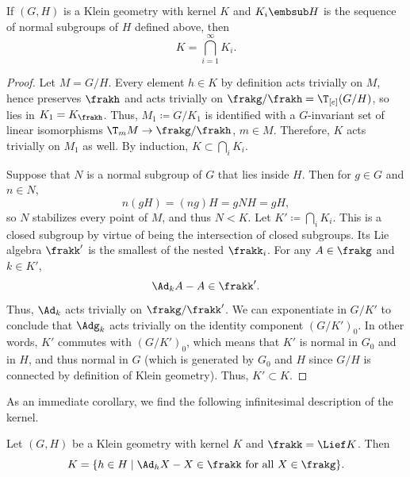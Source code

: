\begin{lem}
    If $(G,H)$ is a Klein geometry with kernel $K$ and $K_i\embsub H$ is the sequence of normal subgroups of $H$ defined above, then 
    \[K=\bigcap_{i=1}^\infty K_i.\]
\end{lem}
\begin{proof}
    Let $M=G\slash H$. Every element $h\in K$ by definition acts trivially on $M$, hence preserves $\frakh$ and acts trivially on $\frakg\slash\frakh=\T_{[e]}(G\slash H)$, so lies in $K_1=K_{\frakh}$. Thus, $M_1\coloneqq G\slash K_1$ is identified with a $G$-invariant set of linear isomorphisms $\T_m M\to \frakg\slash\frakh$, $m\in M$. Therefore, $K$ acts trivially on $M_1$ as well. By induction, $K\subset \bigcap_i K_i$.


    Suppose that $N$ is a normal subgroup of $G$ that lies inside $H$. Then for $g\in G$ and $n\in N$,
    \[n(gH)=(ng)H=gNH=gH,\]
    so $N$ stabilizes every point of $M$, and thus $N<K$. Let $K'\coloneqq \bigcap_i K_i$. This is a closed subgroup by virtue of being the intersection of closed subgroups. Its Lie algebra $\frakk'$ is the smallest of the nested $\frakk_i$. For any $A\in\frakg$ and $k\in K'$, 
    \[\Ad_k A-A\in\frakk'.\]
    Thus, $\Ad_k$ acts trivially on $\frakg\slash\frakk'$. We can exponentiate in $G\slash K'$ to conclude that $\Adg_k$ acts trivially on the identity component $(G\slash K')_0$. In other words, $K'$ commutes with $(G\slash K')_0$, which means that $K'$ is normal in $G_0$ and in $H$, and thus normal in $G$ (which is generated by $G_0$ and $H$ since $G\slash H$ is connected by definition of Klein geometry). Thus, $K'\subset K$.
\end{proof}

As an immediate corollary, we find the following infinitesimal description of the kernel.

\begin{thm}\label{thm 4.4.1 Sharpe}
    Let $(G,H)$ be a Klein geometry with kernel $K$ and $\frakk=\Lief K$. Then 
    \[K=\{h\in H\mid \Ad_h X-X\in\frakk \text{ for all }X\in\frakg\}.\]
\end{thm}

